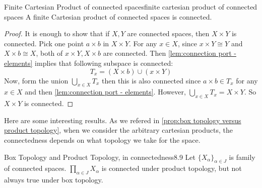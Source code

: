 \documentclass[12pt, a4paper, twoside]{article}
\theoremstyle{plain}
\begin{document}
\begin{thm}{Finite Cartesian Product of connected spaces}{finite cartesian product of connected spaces}
    A finite Cartesian product of connected spaces is connected.
\end{thm}

\begin{proof}
    It is enough to show that if $X, Y$ are connected spaces, then $X \times Y$ is connected. 
    Pick one point $a \times b$ in $X \times Y$. For any $x \in X$, since $x \times Y \cong Y$ and $X \times b \cong X$, 
    both of $x \times Y, X \times b$ are connected. Then \ref{lem:connection port - elements} implies that 
    following subspace is connected: 
    \[T_x = (X \times b) \cup (x \times Y)\]
    Now, form the union $\bigcup_{x \in X} T_x$ then this is also connected since $a \times b \in T_x$ for any $x \in X$ and then \ref{lem:connection port - elements}. 
    However, $\bigcup_{x \in X}T_x = X \times Y$. So $X \times Y$ is connected. 
\end{proof}

Here are some interesting results. As we refered in \ref{prop:box topology versus product topology}, 
when we consider the arbitrary cartesian products, the connectedness depends on what topology we take for the space. 

\begin{thm}{Box Topology and Product Topology, in connectedness}{8.9}
    Let $\{X_\alpha\}_{\alpha \in J}$ is family of connected spaces. 
    $\prod_{\alpha \in J}X_\alpha$ is connected under product topology, but not always true under box topology. 
\end{thm}
\end{document}
